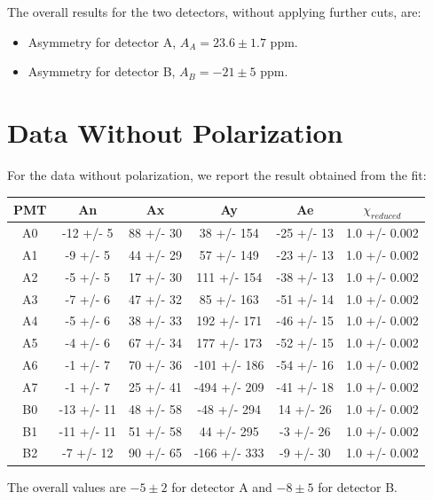The overall results for the two detectors, without applying further cuts, are: 
\begin{itemize}
\item Asymmetry for detector A, $A_{A} =  23.6 \pm 1.7$ ppm.
\item Asymmetry for detector B, $A_{B} = -21 \pm 5$ ppm.
\end{itemize}

\newpage
\section{Data Without Polarization}

For the data without polarization, we report the result obtained from the fit:

\begin{table}[h]
\centering
\begin{tabular}{c|c|c|c|c|c}
\hline
 PMT   & An         & Ax        & Ay           & Ae         & $\chi _{reduced}$   \\
\hline
 A0    & -12 +/- 5  & 88 +/- 30 & 38 +/- 154   & -25 +/- 13 & 1.0 +/- 0.002   \\
 A1    & -9 +/- 5   & 44 +/- 29 & 57 +/- 149   & -23 +/- 13 & 1.0 +/- 0.002   \\
 A2    & -5 +/- 5   & 17 +/- 30 & 111 +/- 154  & -38 +/- 13 & 1.0 +/- 0.002   \\
 A3    & -7 +/- 6   & 47 +/- 32 & 85 +/- 163   & -51 +/- 14 & 1.0 +/- 0.002   \\
 A4    & -5 +/- 6   & 38 +/- 33 & 192 +/- 171  & -46 +/- 15 & 1.0 +/- 0.002   \\
 A5    & -4 +/- 6   & 67 +/- 34 & 177 +/- 173  & -52 +/- 15 & 1.0 +/- 0.002   \\
 A6    & -1 +/- 7   & 70 +/- 36 & -101 +/- 186 & -54 +/- 16 & 1.0 +/- 0.002   \\
 A7    & -1 +/- 7   & 25 +/- 41 & -494 +/- 209 & -41 +/- 18 & 1.0 +/- 0.002   \\
 B0    & -13 +/- 11 & 48 +/- 58 & -48 +/- 294  & 14 +/- 26  & 1.0 +/- 0.002   \\
 B1    & -11 +/- 11 & 51 +/- 58 & 44 +/- 295   & -3 +/- 26  & 1.0 +/- 0.002   \\
 B2    & -7 +/- 12  & 90 +/- 65 & -166 +/- 333 & -9 +/- 30  & 1.0 +/- 0.002   \\
\hline
\end{tabular}
\end{table}

The overall values are $-5 \pm 2$ for detector A and $-8 \pm 5$ for detector B.

